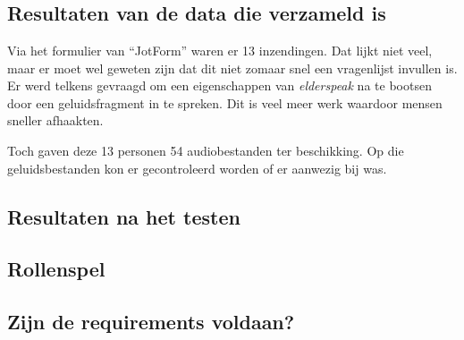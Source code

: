
\chapter{}
\label{ch:resultaten}

\section{Resultaten van de data die verzameld is}
Via het formulier van ``JotForm'' waren er 13 inzendingen. Dat lijkt niet veel, maar er moet wel geweten zijn dat dit niet zomaar snel een vragenlijst invullen is. Er werd telkens gevraagd om een eigenschappen van \textit{elderspeak} na te bootsen door een geluidsfragment in te spreken. Dit is veel meer werk waardoor mensen sneller afhaakten.

Toch gaven deze 13 personen 54 audiobestanden ter beschikking. Op die geluidsbestanden kon er gecontroleerd worden of er \elderspeak aanwezig bij was.

\section{Resultaten na het testen}

\section{Rollenspel}

\section{Zijn de requirements voldaan?}
